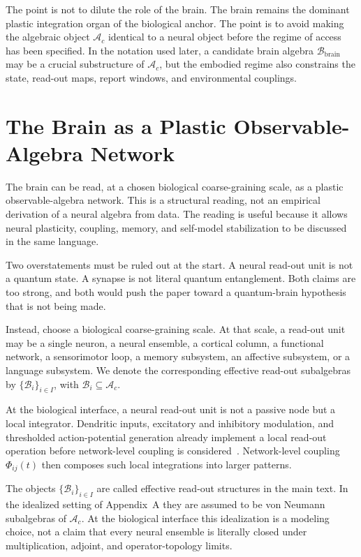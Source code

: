 \documentclass[12pt]{article}
\theoremstyle{definition}
\theoremstyle{remark}
\newcommand{\Ac}{\mathcal A_c}
\newcommand{\Bbrain}{\mathcal B_{\mathrm{brain}}}
\begin{document}
The point is not to dilute the role of the brain. The brain remains the
dominant plastic integration organ of the biological anchor. The point
is to avoid making the algebraic object \(\Ac\) identical to a neural
object before the regime of access has been specified. In the notation
used later, a candidate brain algebra \(\Bbrain\) may be a crucial
substructure of \(\Ac\), but the embodied regime also constrains the
state, read-out maps, report windows, and environmental couplings.

\section{The Brain as a Plastic Observable-Algebra Network}

The brain can be read, at a chosen biological coarse-graining scale, as
a plastic observable-algebra network. This is a structural reading, not
an empirical derivation of a neural algebra from data. The reading is
useful because it allows neural plasticity, coupling, memory, and
self-model stabilization to be discussed in the same language.

Two overstatements must be ruled out at the start. A neural read-out
unit is not a quantum state. A synapse is not literal quantum
entanglement. Both claims are too strong, and both would push the paper
toward a quantum-brain hypothesis that is not being made.

Instead, choose a biological coarse-graining scale. At that scale, a
read-out unit may be a single neuron, a neural ensemble, a cortical
column, a functional network, a sensorimotor loop, a memory subsystem,
an affective subsystem, or a language subsystem. We denote the
corresponding effective read-out subalgebras by
\(\{\mathcal B_i\}_{i\in I}\), with \(\mathcal B_i\subseteq\Ac\).

At the biological interface, a neural read-out unit is not a passive
node but a local integrator. Dendritic inputs, excitatory and inhibitory
modulation, and thresholded action-potential generation already
implement a local read-out operation before network-level coupling is
considered~\cite{StuartSpruston2015}.
Network-level coupling \(\Phi_{ij}(t)\) then composes such local
integrations into larger patterns.

The objects \(\{\mathcal B_i\}_{i\in I}\) are called effective
read-out structures in the main text. In the idealized setting of
Appendix~A they are assumed to be von Neumann subalgebras of \(\Ac\).
At the biological interface this idealization is a modeling choice, not
a claim that every neural ensemble is literally closed under
multiplication, adjoint, and operator-topology limits.
\end{document}
